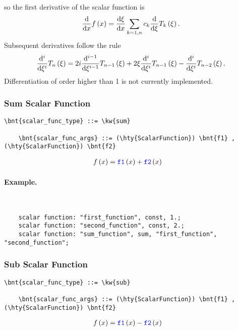 so the first derivative of the scalar function is
\begin{equation}
	\frac{\mathrm{d}}{\mathrm{d}x}f\left( x \right) = \frac{\mathrm{d}\xi}{\mathrm{d}x} \sum_{k=1,n} c_k \frac{\mathrm{d}}{\mathrm{d}\xi} T_k\left( \xi \right) .
\end{equation}
Subsequent derivatives follow the rule
\begin{equation}
	\frac{\mathrm{d}^i}{\mathrm{d}\xi^i}T_n\left( \xi \right) =
		2 i \frac{\mathrm{d}^{i-1}}{\mathrm{d}\xi^{i-1}}T_{n-1}\left( \xi \right)
		+ 2 \xi \frac{\mathrm{d}^i}{\mathrm{d}\xi^i}T_{n-1}\left( \xi \right)
		- \frac{\mathrm{d}^i}{\mathrm{d}\xi^i}T_{n-2}\left( \xi \right) .
\end{equation}
Differentiation of order higher than 1 is not currently implemented.


\subsubsection{Sum Scalar Function}
\begin{Verbatim}[commandchars=\\\{\}]
    \bnt{scalar_func_type} ::= \kw{sum}

    \bnt{scalar_func_args} ::= (\hty{ScalarFunction}) \bnt{f1} , (\hty{ScalarFunction}) \bnt{f2}
\end{Verbatim}
\begin{align}
	f\left( x \right)
	&=
	\textcolor{blue}{\texttt{f1}}\left( x \right) + \textcolor{blue}{\texttt{f2}}\left( x \right)
\end{align}

\paragraph{Example.} \
\begin{verbatim}
    scalar function: "first_function", const, 1.;
    scalar function: "second_function", const, 2.;
    scalar function: "sum_function", sum, "first_function", "second_function";
\end{verbatim}


\subsubsection{Sub Scalar Function}
\begin{Verbatim}[commandchars=\\\{\}]
    \bnt{scalar_func_type} ::= \kw{sub}

    \bnt{scalar_func_args} ::= (\hty{ScalarFunction}) \bnt{f1} , (\hty{ScalarFunction}) \bnt{f2}
\end{Verbatim}
\begin{align}
	f\left( x \right)
	&=
	\textcolor{blue}{\texttt{f1}}\left( x \right) - \textcolor{blue}{\texttt{f2}}\left( x \right)
\end{align}

